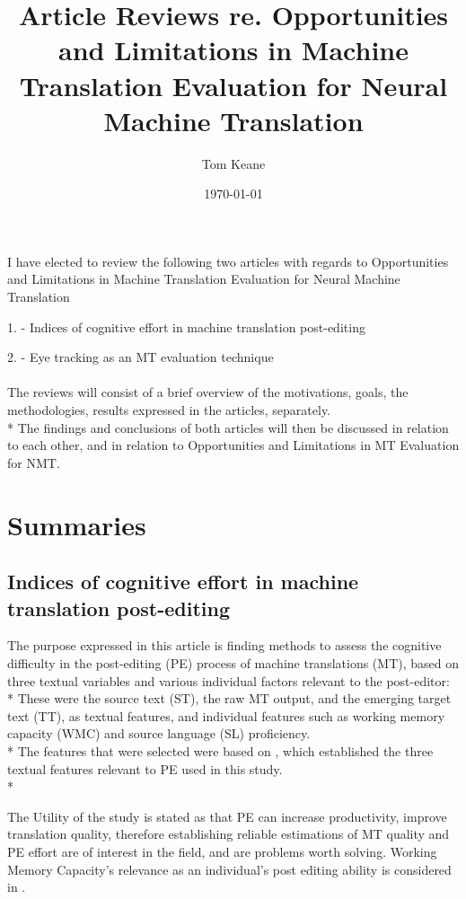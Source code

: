 \documentclass[12pt]{article}
\title{Article Reviews re. Opportunities and Limitations in Machine Translation Evaluation for Neural Machine Translation
}
\author{Tom Keane}
\date{\today}
\begin{document}
	\maketitle
	
	I have elected to review the following two articles with regards to Opportunities and Limitations in Machine Translation Evaluation for Neural Machine Translation
	
	1. - Indices of cognitive effort in machine translation post-editing \cite{10.2307/44113775}
	
	2. - Eye tracking as an MT evaluation technique \cite{EyeTracking}\\\\
%
	The reviews will consist of a brief overview of the motivations,  goals, the methodologies, results expressed in the articles, separately.\\*
	 The findings and conclusions of both articles will then be discussed in relation to each other, and in relation to Opportunities and Limitations in 
	 MT Evaluation for NMT.
	
	\section{Summaries}
		\subsection{Indices of cognitive effort in machine translation post-editing}
			The purpose expressed in this article is finding methods to assess the cognitive difficulty in the post-editing (PE) process of machine translations (MT), based on three textual variables and various individual factors relevant to the post-editor:\\*
			These were the source text (ST), the raw MT output, and the emerging target text (TT), as textual features, and individual features such as working memory capacity (WMC) and source language (SL) proficiency.\\*
			The features that were selected were based on \textcite{Kittredge2002KringsHP}, which established the three textual features relevant to PE used in this study.\\*
			
			The Utility of the study is stated as that PE can increase productivity, improve translation quality, therefore establishing reliable estimations of MT quality and PE effort are of interest in the field, and are problems worth solving.
			Working Memory Capacity's relevance as an individual's post editing ability is considered in \textcite{10.1007/978-3-642-32612-7_1}.\\
			
\end{document}
